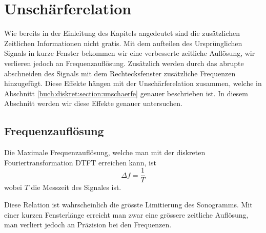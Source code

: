 %
%
%
%
\section{Unschärferelation
\label{sonogramm:section:teil1}}
Wie bereits in der Einleitung des Kapitels angedeutet sind die zusätzlichen
Zeitlichen Informationen nicht gratis. 
Mit dem aufteilen des Ursprünglichen Signals in kurze Fenster bekommen wir eine
verbesserte zeitliche Auflösung, wir verlieren jedoch an Frequenzauflösung.
Zusätzlich werden durch das abrupte abschneiden des Signals mit dem Rechtecksfenster
zusätzliche Frequenzen hinzugefügt. 
Diese Effekte hängen mit der Unschärferelation zusammen, welche in Abschnitt
\ref{buch:diskret:section:unschaerfe} genauer beschrieben ist.
In diesem Abschnitt werden wir diese Effekte genauer untersuchen.
\subsection{Frequenzauflösung}
Die Maximale Frequenzauflösung, welche man mit der diskreten Fouriertransformation DTFT erreichen
kann, ist 
\begin{equation}
    \Delta f = \frac{1}{T}
\end{equation}
wobei $T$ die Messzeit des Signales ist.

Diese Relation ist wahrscheinlich die grösste Limitierung des Sonogramms.
Mit einer kurzen Fensterlänge erreicht man zwar eine grössere zeitliche Auflösung,
man verliert jedoch an Präzision bei den Frequenzen.

